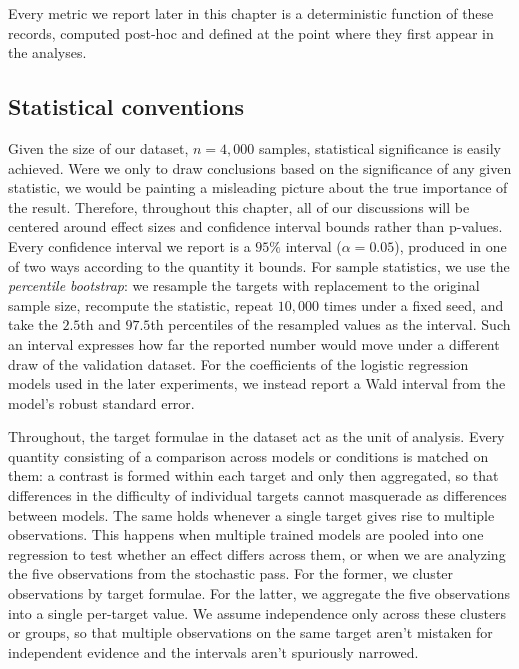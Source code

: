 \documentclass[titlepage,a4paper,11pt]{report}
\begin{document}
    Every metric we report later in this chapter is a deterministic function of these records, computed post-hoc and defined at the point where they first appear in the analyses.

    
    \subsection{Statistical conventions}\label{sec:stats_framework}
    Given the size of our dataset, $n = 4{,}000$ samples, statistical significance is easily achieved. Were we only to draw conclusions based on the significance of any given statistic, we would be painting a misleading picture about the true importance of the result. Therefore, throughout this chapter, all of our discussions will be centered around effect sizes and confidence interval bounds rather than p-values. Every confidence interval we report is a $95\%$ interval ($\alpha = 0.05$), produced in one of two ways according to the quantity it bounds. For sample statistics, we use the \emph{percentile bootstrap}: we resample the targets with replacement to the original sample size, recompute the statistic, repeat $10{,}000$ times under a fixed seed, and take the $2.5$th and $97.5$th percentiles of the resampled values as the interval. Such an interval expresses how far the reported number would move under a different draw of the validation dataset. For the coefficients of the logistic regression models used in the later experiments, we instead report a Wald interval from the model's robust standard error.

    Throughout, the target formulae in the dataset act as the unit of analysis. Every quantity consisting of a comparison across models or conditions is matched on them: a contrast is formed within each target and only then aggregated, so that differences in the difficulty of individual targets cannot masquerade as differences between models. The same holds whenever a single target gives rise to multiple observations. This happens when multiple trained models are pooled into one regression to test whether an effect differs across them, or when we are analyzing the five observations from the stochastic pass. For the former, we cluster observations by target formulae. For the latter, we aggregate the five observations into a single per-target value. We assume independence only across these clusters or groups, so that multiple observations on the same target aren't mistaken for independent evidence and the intervals aren't spuriously narrowed.
\end{document}
